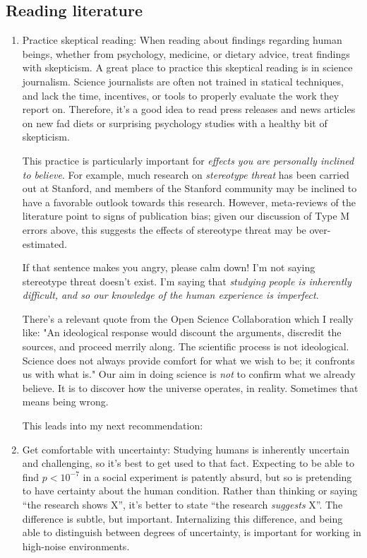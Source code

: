 \documentclass{tufte-handout}
\begin{document}
\subsection{Reading literature}
\label{sec:orgc35c2cd}
\begin{enumerate}
\item Practice skeptical reading:
\label{sec:orga55366b}
When reading about findings regarding human beings, whether from psychology,
medicine, or dietary advice, treat findings with skepticism. A great place to
practice this skeptical reading is in science journalism. Science journalists
are often not trained in statical techniques, and lack the time, incentives, or
tools to properly evaluate the work they report on. Therefore, it's a good idea
to read press releases and news articles on new fad diets or surprising
psychology studies with a healthy bit of skepticism.

This practice is particularly important for \emph{effects you are personally inclined
to believe}. For example, much research on \emph{stereotype threat} has been carried
out at Stanford, and members of the Stanford community may be inclined to have a
favorable outlook towards this research.\cite{spencer1999stereotype} However,
meta-reviews \cite{flore2015does} of the literature point to signs of publication
bias; given our discussion of Type M errors above, this suggests the effects of
stereotype threat may be over-estimated.

If that sentence makes you angry, please calm down! I'm not saying stereotype
threat doesn't exist. I'm saying that \emph{studying people is inherently difficult,
and so our knowledge of the human experience is imperfect}.

There's a relevant quote from the Open Science Collaboration which I really
like: "An ideological response would discount the arguments, discredit the
sources, and proceed merrily along. The scientific process is not ideological.
Science does not always provide comfort for what we wish to be; it confronts us
with what is."\cite{open2015estimating} Our aim in doing science is \emph{not} to
confirm what we already believe. It is to discover how the universe operates, in
reality. Sometimes that means being wrong.

This leads into my next recommendation:

\item Get comfortable with uncertainty:
\label{sec:orgbacddb0}
Studying humans is inherently uncertain and challenging, so it's best to get
used to that fact. Expecting to be able to find \(p<10^{-7}\) in a social
experiment is patently absurd, but so is pretending to have certainty about the
human condition. Rather than thinking or saying ``the research shows X'', it's
better to state ``the research \emph{suggests} X''. The difference is subtle, but
important. Internalizing this difference, and being able to distinguish between
degrees of uncertainty, is important for working in high-noise environments.


\end{enumerate}
\end{document}
